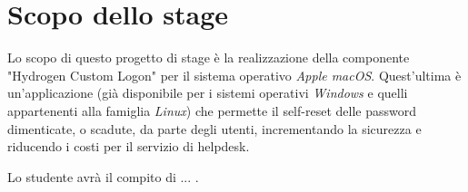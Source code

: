 \section*{Scopo dello stage}
Lo scopo di questo progetto di stage è la realizzazione della componente "Hydrogen Custom Logon" per il sistema operativo \textit{Apple macOS}. Quest'ultima è un'applicazione (già disponibile per i sistemi operativi \textit{Windows} e quelli appartenenti alla famiglia \textit{Linux}) che permette il self-reset delle password dimenticate, o scadute, da parte degli utenti, incrementando la sicurezza e riducendo i costi per il servizio di helpdesk.

Lo studente avrà il compito di ... .

